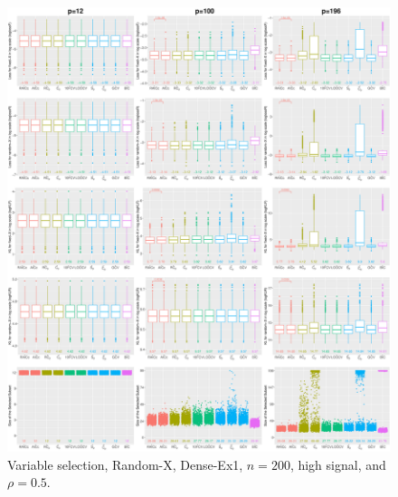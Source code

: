 \begin{figure}[!ht]
\centering
\includegraphics[width=\textwidth]{figures/supplement/randomx/subset_selection/Dense-Ex1_n200_hsnr_rho05.eps}
\caption{Variable selection, Random-X, Dense-Ex1, $n=200$, high signal, and $\rho=0.5$.}
\end{figure}
\clearpage
